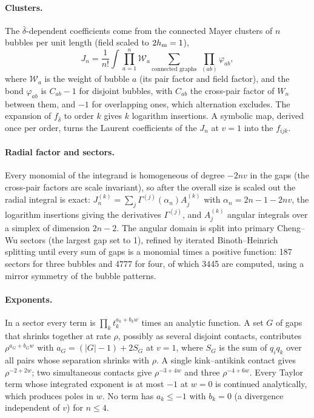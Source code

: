 \documentclass[11pt,a4paper]{article}
\numberwithin{equation}{section}
\newcommand{\db}{\bar\delta}
\begin{document}
\paragraph{Clusters.} The $\db$-dependent coefficients come from the connected Mayer clusters of $n$ bubbles per unit
length (field scaled to $2h_{\rm m}=1$),
\begin{equation}
 J_n=\frac1{n!}\int\prod_{a=1}^n\mathcal W_a\sum_{\text{connected graphs}}\ \prod_{(ab)}\varphi_{ab},
\end{equation}
where $\mathcal W_a$ is the weight of bubble $a$ (its pair factor and field factor), and the bond $\varphi_{ab}$ is
$C_{ab}-1$ for disjoint bubbles, with $C_{ab}$ the cross-pair factor of $W_n$ between them, and $-1$ for overlapping
ones, which alternation excludes. The expansion of $f_{\db}$ to order $k$ gives $k$ logarithm insertions. A symbolic
map, derived once per order, turns the Laurent coefficients of the $J_n$ at $v=1$ into the $f_{ijk}$.

\paragraph{Radial factor and sectors.} Every monomial of the integrand is homogeneous of degree $-2nv$ in the gaps (the
cross-pair factors are scale invariant), so after the overall size is scaled out the radial integral is exact:
$J_n^{(k)}=\sum_j\Gamma^{(j)}(\alpha_n)A_j^{(k)}$ with $\alpha_n=2n-1-2nv$, the logarithm insertions giving the
derivatives $\Gamma^{(j)}$, and $A_j^{(k)}$ angular integrals over a simplex of dimension $2n-2$. The angular domain is
split into primary Cheng--Wu sectors (the largest gap set to 1), refined by iterated Binoth--Heinrich splitting until
every sum of gaps is a monomial times a positive function: 187 sectors for three bubbles and 4777 for four, of which
3445 are computed, using a mirror symmetry of the bubble patterns.

\paragraph{Exponents.} In a sector every term is $\prod_kt_k^{a_k+b_kw}$ times an analytic function. A set $G$ of
gaps that shrinks together at rate $\rho$, possibly as several disjoint contacts, contributes
$\rho^{a_G+b_Gw}$ with $a_G=(|G|-1)+2S_G$ at $v=1$, where $S_G$ is the sum of $q_iq_k$ over all pairs whose separation
shrinks with $\rho$. A single kink--antikink contact gives $\rho^{-2+2w}$; two simultaneous contacts give
$\rho^{-3+4w}$ and three $\rho^{-4+6w}$. Every Taylor term whose integrated exponent is at most $-1$ at $w=0$ is
continued analytically, which produces poles in $w$. No term has $a_k\le-1$ with $b_k=0$ (a divergence independent of
$v$) for $n\le4$.
\end{document}
